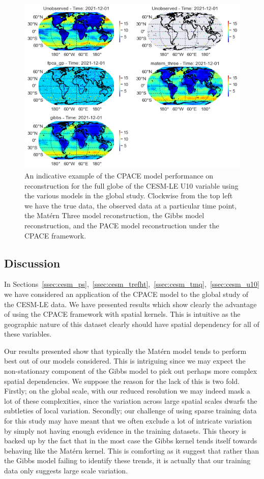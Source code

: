 \begin{figure}
\centering
\includegraphics[width=\textwidth]{full_ex_u10_globe}
\caption{An indicative example of the CPACE model performance on reconstruction for the full globe of the CESM-LE U10 variable using the various models in the global study. Clockwise from the top left we have the true data, the observed data at a particular time point, the Mat\'ern Three model reconstruction, the Gibbs model reconstruction, and the PACE model reconstruction under the CPACE framework.}
\label{fig:full_ex_u10_globe}
\end{figure}

\subsection{Discussion \label{ssec:globe_discussion}}
In Sections~\ref{ssec:cesm_ps},~\ref{ssec:cesm_trefht},~\ref{ssec:cesm_tmq},~\ref{ssec:cesm_u10} we have considered an application of the CPACE model to the global study of the CESM-LE data. 
We have presented results which show clearly the advantage of using the CPACE framework with spatial kernels.
This is intuitive as the geographic nature of this dataset clearly should have spatial dependency for all of these variables.

Our results presented show that typically the Mat\'ern model tends to perform best out of our models considered.
This is intriguing since we may expect the non-stationary component of the Gibbs model to pick out perhaps more complex spatial dependencies.
We suppose the reason for the lack of this is two fold.
Firstly; on the global scale, with our reduced resolution we may indeed mask a lot of these complexities, since the variation across large spatial scales dwarfs the subtleties of local variation.
Secondly; our challenge of using sparse training data for this study may have meant that we often exclude a lot of intricate variation by simply not having enough evidence in the training datasets. 
This theory is backed up by the fact that in the most case the Gibbs kernel tends itself towards behaving like the Mat\'ern kernel.
This is comforting as it suggest that rather than the Gibbs model failing to identify these trends, it is actually that our training data only suggests large scale variation.

